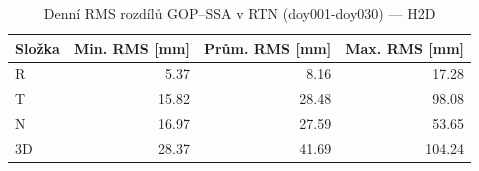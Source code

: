 \begin{table}[H]
\centering
\caption{Denní RMS rozdílů GOP–SSA v RTN (doy001-doy030) — H2D}
\label{tab:hd_ZAZG_doy001-doy030_rms}
\begin{tabular}{lrrr}
\toprule
Složka & Min. RMS [mm] & Prům. RMS [mm] & Max. RMS [mm] \\
\midrule
R & 5.37 & 8.16 & 17.28 \\
T & 15.82 & 28.48 & 98.08 \\
N & 16.97 & 27.59 & 53.65 \\
3D & 28.37 & 41.69 & 104.24 \\
\bottomrule
\end{tabular}
\end{table}
